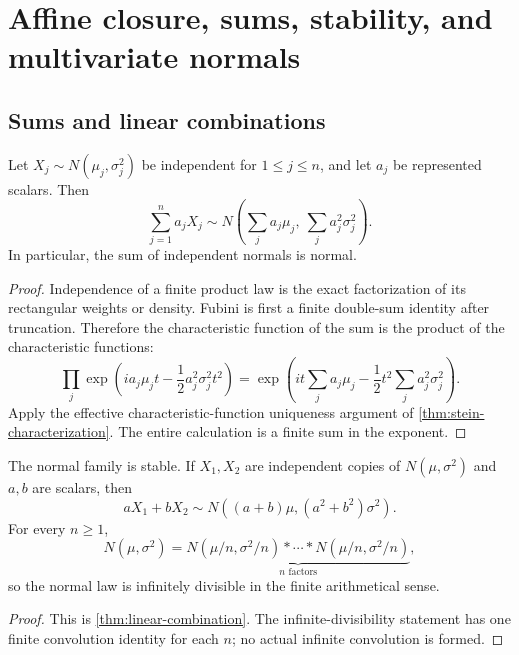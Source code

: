 \section{Affine closure, sums, stability, and multivariate normals}\label{sec:closure}

\subsection{Sums and linear combinations}

\begin{theorem}\label{thm:linear-combination}
Let $X_j\sim N(\mu_j,\sigma_j^2)$ be independent for $1\le j\le n$, and let $a_j$ be represented scalars.  Then
\begin{equation}\label{eq:linear-combination}
 \sum_{j=1}^na_jX_j
 \sim N\!\left(\sum_ja_j\mu_j,\ \sum_ja_j^2\sigma_j^2\right).
\end{equation}
In particular, the sum of independent normals is normal.
\end{theorem}

\begin{proof}
Independence of a finite product law is the exact factorization of its rectangular weights or density.  Fubini is first a finite double-sum identity after truncation.  Therefore the characteristic function of the sum is the product of the characteristic functions:
\[
 \prod_j\exp\!\left(ia_j\mu_jt-\frac12a_j^2\sigma_j^2t^2\right)
 =\exp\!\left(it\sum_ja_j\mu_j-\frac12t^2\sum_ja_j^2\sigma_j^2\right).
\]
Apply the effective characteristic-function uniqueness argument of \cref{thm:stein-characterization}.  The entire calculation is a finite sum in the exponent.
\end{proof}

\begin{corollary}\label{cor:stability}
The normal family is stable.  If $X_1,X_2$ are independent copies of $N(\mu,\sigma^2)$ and $a,b$ are scalars, then
\[
 aX_1+bX_2\sim N((a+b)\mu,(a^2+b^2)\sigma^2).
\]
For every $n\ge1$,
\[
 N(\mu,\sigma^2)
 =\underbrace{N(\mu/n,\sigma^2/n)*\cdots*N(\mu/n,\sigma^2/n)}_{n\text{ factors}},
\]
so the normal law is infinitely divisible in the finite arithmetical sense.
\end{corollary}

\begin{proof}
This is \cref{thm:linear-combination}.  The infinite-divisibility statement has one finite convolution identity for each $n$; no actual infinite convolution is formed.
\end{proof}

